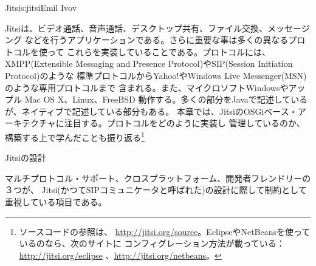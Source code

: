 \begin{aosachapter}{Jitsi}{s:jitsi}{Emil Ivov}

Jitsiは、ビデオ通話、音声通話、デスクトップ共有、ファイル交換、メッセージング
などを行うアプリケーションである。さらに重要な事は多くの異なるプロトコルを使って
これらを実装していることである。プロトコルには、XMPP(Extensible Messaging
and Presence Protocol)やSIP(Session Initiation Protocol)のような
標準プロトコルからYahoo!やWindows Live Messenger(MSN)のような専用プロトコルまで
含まれる。また、マイクロソフトWindowsやアップル Mac OS X、Linux、FreeBSD
動作する。多くの部分をJavaで記述しているが、ネイティブで記述している部分もある。
本章では、JitsiのOSGiベース・アーキテクチャに注目する。プロトコルをどのように実装し
管理しているのか、構築する上で学んだことも振り返る\footnote{ソースコードの参照は、
\url{http://jitsi.org/source}。EclipseやNetBeansを使っているのなら、次のサイトに
コンフィグレーション方法が載っている： \url{http://jitsi.org/eclipse}
、\url{http://jitsi.org/netbeans}。}

\begin{aosasect1}{Jitsiの設計}

マルチプロトコル・サポート、クロスプラットフォーム、開発者フレンドリーの３つが、
Jitsi(かつてSIPコミュニケータと呼ばれた)の設計に際して制約として重視している項目である。


\end{aosasect1}
\end{aosachapter}

